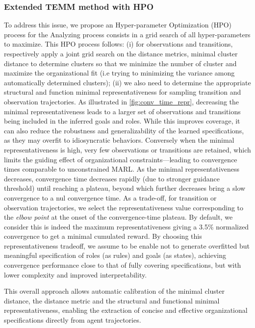 \documentclass[pdflatex,sn-mathphys-num]{sn-jnl}%
\theoremstyle{thmstyleone}%
\theoremstyle{thmstyletwo}%
\theoremstyle{thmstylethree}%
\begin{document}
\subsubsection{Extended TEMM method with HPO}
To address this issue, we propose an Hyper-parameter Optimization (HPO) process for the Analyzing process consists in a grid search of all hyper-parameters to maximize. This HPO process follows:
%
(i) for observations and transitions, respectively apply a joint grid search on the distance metrics, minimal cluster distance to determine clusters so that we minimize the number of cluster and maximize the organizational fit (i.e trying to minimizing the variance among automatically determined clusters);
%
(ii) we also need to determine the appropriate structural and function minimal representativeness for sampling transition and observation trajectories. As illustrated in \autoref{fig:conv_time_repr}, decreasing the minimal representativeness leads to a larger set of observations and transitions being included in the inferred goals and roles. While this improves coverage, it can also reduce the robustness and generalizability of the learned specifications, as they may overfit to idiosyncratic behaviors.
%
Conversely when the minimal representativeness is high, very few observations or transitions are retained, which limits the guiding effect of organizational constraints—leading to convergence times comparable to unconstrained MARL. As the minimal representativeness decreases, convergence time decreases rapidly (due to stronger guidance threshold) until reaching a plateau, beyond which further decreases bring a slow convergence to a nul convergence time.
%
As a trade-off, for transition or observation trajectories, we select the representativeness value corresponding to the \textit{elbow point} at the onset of the convergence-time plateau. By default, we consider this is indeed the maximum representativeness giving a 3.5\% normalized convergence to get a minimal cumulated reward. By choosing this representativeness tradeoff, we assume to be enable not to generate overfitted but meaningful specification of roles (as rules) and goals (as states), achieving convergence performance close to that of fully covering specifications, but with lower complexity and improved interpretability.

This overall approach allows automatic calibration of the minimal cluster distance, the distance metric and the structural and functional minimal representativeness, enabling the extraction of concise and effective organizational specifications directly from agent trajectories.
\end{document}
